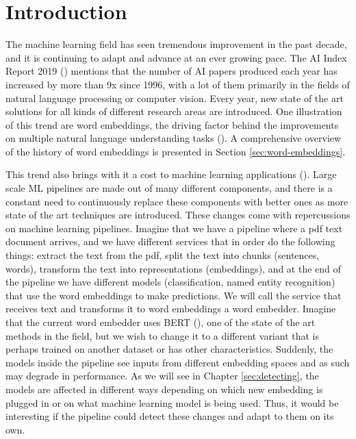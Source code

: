 \documentclass[12pt]{extreport}
\begin{document}
\tableofcontents

\listoffigures

\listoftables

\chapter{Introduction} \label{sec:intro}

The machine learning field has seen tremendous improvement in the past decade, and it is continuing to adapt and advance at an ever growing pace. The AI Index Report 2019 (\cite{aiindex2019}) mentions that the number of AI papers produced each year has increased by more than 9x since 1996, with a lot of them primarily in the fields of natural language processing or computer vision. Every year, new state of the art solutions for all kinds of different research areas are introduced. One illustration of this trend are word embeddings, the driving factor behind the improvements on multiple natural language understanding tasks (\cite{dissecting}). A comprehensive overview of the history of word embeddings is presented in Section \ref{sec:word-embeddings}.

This trend also brings with it a cost to machine learning applications (\cite{challenges-ml-models}). Large scale ML pipelines are made out of many different components, and there is a constant need to continuously replace these components with better ones as more state of the art techniques are introduced. These changes come with repercussions on machine learning pipelines. Imagine that we have a pipeline where a pdf text document arrives, and we have different services that in order do the following things: extract the text from the pdf, split the text into chunks (sentences, words), transform the text into representations (embeddings), and at the end of the pipeline we have different models (classification, named entity recognition) that use the word embeddings to make predictions. We will call the service that receives text and transforms it to word embeddings a word embedder. Imagine that the current word embedder uses BERT (\cite{bert}), one of the state of the art methods in the field, but we wish to change it to a different variant that is perhaps trained on another dataset or has other characteristics. Suddenly, the models inside the pipeline see inputs from different embedding spaces and as such may degrade in performance. As we will see in Chapter \ref{sec:detecting}, the models are affected in different ways depending on which new embedding is plugged in or on what machine learning model is being used. Thus, it would be interesting if the pipeline could detect these changes and adapt to them on its own.
\end{document}
